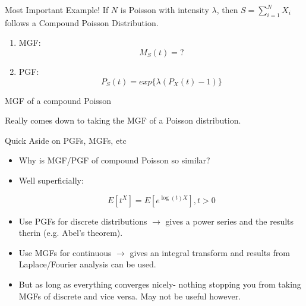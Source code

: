 \documentclass[11pt]{beamer}
\begin{document}
\begin{frame}{Most Important Example!}
If $N$ is Poisson with intensity $\lambda$, then $S = \sum^N_{i= 1} X_i$ follows a \alert{Compound Poisson Distribution}.

\vfill

\begin{enumerate}
\item MGF: $$M_S(t)=?$$
\item PGF: $$P_S(t)=exp \{ \lambda (P_X (t) - 1) \}$$
\end{enumerate}
\end{frame}
\begin{frame}{MGF of a compound Poisson}

\vspace{-4 cm} Really comes down to taking the MGF of a Poisson distribution. 

\end{frame}
\begin{frame}{Quick Aside on PGFs, MGFs, etc}

\begin{itemize}

\item Why is MGF/PGF of compound Poisson so similar? 

\vfill
 
\item Well superficially:

$$ E[t^X] = E[e^{ \log(t) X }], t>0  $$

\vfill

\item Use PGFs for discrete distributions $\rightarrow$ gives a power series and the results therin (e.g. Abel's theorem).

\vfill

\item Use MGFs for continuous $\rightarrow$ gives an integral transform and results from Laplace/Fourier analysis can be used. 

\vfill

\item But as long as everything converges nicely- nothing stopping you from taking MGFs of discrete and vice versa. May not be useful however. 

\end{itemize}

\end{frame}
\end{document}
